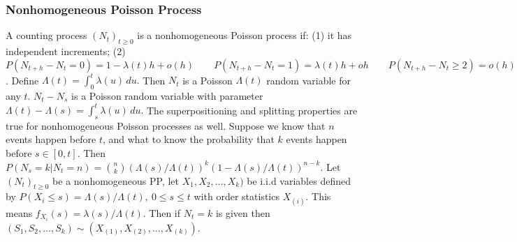 \subsubsection*{Nonhomogeneous Poisson Process}
 A counting process $(N_t)_{t \ge 0}$ is a nonhomogeneous Poisson process if:
(1) it has independent increments;
(2) $P(N_{t+h} - N_t = 0) = 1 - \lambda(t)h +o(h) \qquad P(N_{t+h} - N_t = 1) = \lambda(t)h +oh \qquad P(N_{t+h} - N_t \ge 2) = o(h)$.
 Define 
$\Lambda(t) = \int^t_0 \lambda(u)\, du.$ 
Then $N_t$ is a Poisson $\Lambda(t)$ random variable for any $t$.
 $N_t - N_s$ is a Poisson random variable with parameter $\Lambda(t) -\Lambda(s) = \int^{t}_s \lambda(u)\, du.$
 The superpositioning and splitting properties are true for nonhomogeneous Poisson processes as well.
 Suppose we know that $n$ events happen before $t$, and what to know the probability that $k$ events happen before $s \in [0, t]$. Then 
$P(N_s = k| N_t = n) = \binom{n}{k} \left(\Lambda(s)/\Lambda(t) \right)^k (1- \Lambda(s)/\Lambda(t))^{n-k}$.
 Let $(N_t)_{t \ge 0}$ be a nonhomogeneous PP, let $X_1, X_2,\ldots, X_k)$ be i.i.d variables defined by $P(X_i \le s) = \Lambda(s)/\Lambda(t),\ 0 \le s \le t$ with order statistics $X_{(i)}$. This means $f_{X_i}(s) = \lambda(s)/\Lambda(t)$. Then if $N_t = k$ is given then 
$(S_1, S_2, \ldots, S_k) \sim (X_{(1)},X_{(2)},\ldots,X_{(k)})$.